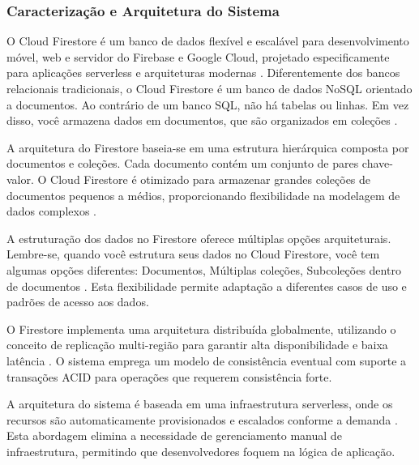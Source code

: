 \subsubsection{Caracterização e Arquitetura do Sistema}
O Cloud Firestore é um banco de dados flexível e escalável para desenvolvimento móvel, web e servidor do Firebase e Google Cloud, projetado especificamente para aplicações serverless e arquiteturas modernas \cite{firebase_choose_database}. Diferentemente dos bancos relacionais tradicionais, o Cloud Firestore é um banco de dados NoSQL orientado a documentos. Ao contrário de um banco SQL, não há tabelas ou linhas. Em vez disso, você armazena dados em documentos, que são organizados em coleções \cite{firebase_data_model}.

A arquitetura do Firestore baseia-se em uma estrutura hierárquica composta por documentos e coleções. Cada documento contém um conjunto de pares chave-valor. O Cloud Firestore é otimizado para armazenar grandes coleções de documentos pequenos a médios, proporcionando flexibilidade na modelagem de dados complexos \cite{firebase_data_model}.

A estruturação dos dados no Firestore oferece múltiplas opções arquiteturais. Lembre-se, quando você estrutura seus dados no Cloud Firestore, você tem algumas opções diferentes: Documentos, Múltiplas coleções, Subcoleções dentro de documentos \cite{firebase_data_model}. Esta flexibilidade permite adaptação a diferentes casos de uso e padrões de acesso aos dados.

O Firestore implementa uma arquitetura distribuída globalmente, utilizando o conceito de replicação multi-região para garantir alta disponibilidade e baixa latência \cite{firebase_firestore_docs}. O sistema emprega um modelo de consistência eventual com suporte a transações ACID para operações que requerem consistência forte.

A arquitetura do sistema é baseada em uma infraestrutura serverless, onde os recursos são automaticamente provisionados e escalados conforme a demanda \cite{medium_firestore_overview}. Esta abordagem elimina a necessidade de gerenciamento manual de infraestrutura, permitindo que desenvolvedores foquem na lógica de aplicação.

